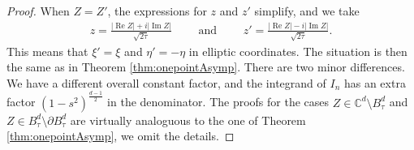 \documentclass[%
 jmp,
cp,  %
 amsmath,amsthm,amssymb,%
 reprint,%
onecolumn]{revtex4-2}
\begin{document}
\begin{proof}
When $Z=Z'$, the expressions for $z$ and $z'$ simplify, and we take 
\begin{align*}
z = \frac{\lvert \operatorname{Re} Z\rvert + i \lvert \operatorname{Im} Z\rvert}{\sqrt{2\tau}}
\qquad\text{ and }\qquad
z' = \frac{\lvert \operatorname{Re} Z\rvert - i \lvert \operatorname{Im} Z\rvert}{\sqrt{2\tau}}. 
\end{align*}
This means that $\xi'=\xi$ and $\eta'= -\eta$ in elliptic coordinates. The situation is then the same as in Theorem \ref{thm:onepointAsymp}. There are two minor differences. We have a different overall constant factor, and the integrand of $I_n$ has an extra factor $(1-s^2)^{\frac{d-1}{2}}$ in the denominator. The proofs for the cases $Z\in \mathbb C^d\setminus B_\tau^d$ and $Z\in B_\tau^d\setminus \partial B_\tau^d$ are virtually analoguous to the one of Theorem \ref{thm:onepointAsymp}, we omit the details. 


\end{proof}
\end{document}
